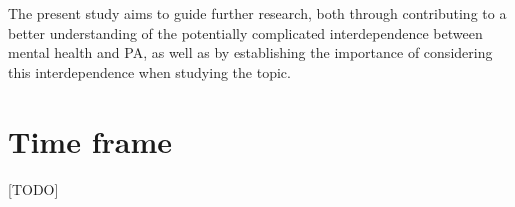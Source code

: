 \documentclass[a4paper,11pt]{report}
\begin{document}
The present study aims to guide further research, both through contributing to a better understanding of the potentially
complicated interdependence between mental health and PA, as well as by establishing the importance of considering this
interdependence when studying the topic.

\section*{Time frame}
[TODO]




\end{document}
